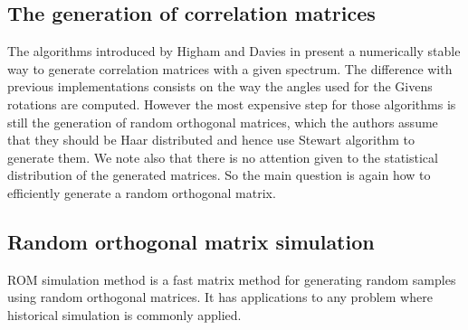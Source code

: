 \documentclass[a4paper]{article}
\begin{document}
\subsection{The generation of correlation matrices}
The algorithms introduced by Higham and Davies in \cite{Davies00numericallystable} present a numerically stable way to 
generate correlation matrices with a given spectrum. The difference with previous implementations \cite{lin_Bendel85,FNAG} 
consists on the way the angles used for the Givens rotations are computed. However the most expensive step 
for those algorithms is still the generation of random orthogonal matrices, which the authors assume that 
they should be Haar distributed and hence use Stewart algorithm to generate them. We note also that 
there is no attention given to the statistical distribution of the generated matrices.
So the main question is again how to efficiently generate a random orthogonal matrix. 

\subsection{Random orthogonal matrix simulation}

ROM simulation method is a fast matrix method for generating random samples using 
random orthogonal matrices. It has applications to any problem where historical 
simulation is commonly applied.




{

}
\end{document}
